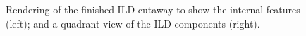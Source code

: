 %

\begin{figure}[p]%
	\centering
    \qquad
    \caption{Rendering of the finished \acrshort{ILD} cutaway to show the internal features (left); and a quadrant view of the \acrshort{ILD} components (right).}%
    \label{figure:colliders/ILD/double}%
\end{figure}

